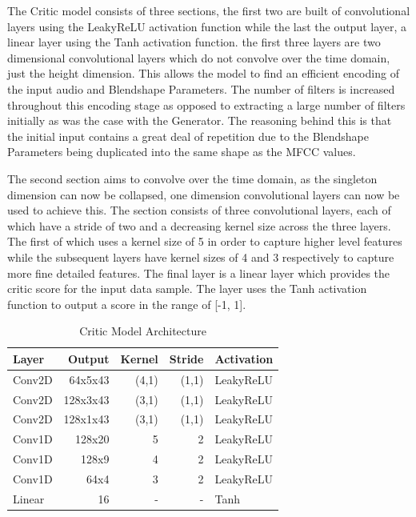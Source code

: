 The Critic model consists of three sections, the first two are built of convolutional layers using the LeakyReLU activation function while the last the output layer, a linear layer using the Tanh activation function.
the first three layers are two dimensional convolutional layers which do not convolve over the time domain, just the height dimension.
This allows the model to find an efficient encoding of the input audio and Blendshape Parameters.
The number of filters is increased throughout this encoding stage as opposed to extracting a large number of filters initially as was the case with the Generator.
The reasoning behind this is that the initial input contains a great deal of repetition due to the Blendshape Parameters being duplicated into the same shape as the MFCC values.

The second section aims to convolve over the time domain, as the singleton dimension can now be collapsed, one dimension convolutional layers can now be used to achieve this.
The section consists of three convolutional layers, each of which have a stride of two and a decreasing kernel size across the three layers.
The first of which uses a kernel size of 5 in order to capture higher level features while the subsequent layers have kernel sizes of 4 and 3 respectively to capture more fine detailed features.
The final layer is a linear layer which provides the critic score for the input data sample.
The layer uses the Tanh activation function to output a score in the range of [-1, 1].

\begin{table}[h!]
\centering
    \begin{tabular}{ l | r | r | r | l}
    \textbf{Layer} & \textbf{Output} & \textbf{Kernel} & \textbf{Stride} & \textbf{Activation} \\ \hline
    Conv2D & 64x5x43   & (4,1) & (1,1) & LeakyReLU \\ \hline
    Conv2D & 128x3x43  & (3,1) & (1,1) & LeakyReLU \\ \hline
    Conv2D & 128x1x43  & (3,1) & (1,1) & LeakyReLU \\ \hline
    Conv1D & 128x20    & 5     & 2     & LeakyReLU \\ \hline
    Conv1D & 128x9     & 4     & 2     & LeakyReLU \\ \hline
    Conv1D & 64x4      & 3     & 2     & LeakyReLU \\ \hline
    Linear & 16        & -     & -     & Tanh      
    \end{tabular} 
    \caption{Critic Model Architecture}\label{table:gan_critic_arch}
\end{table}

